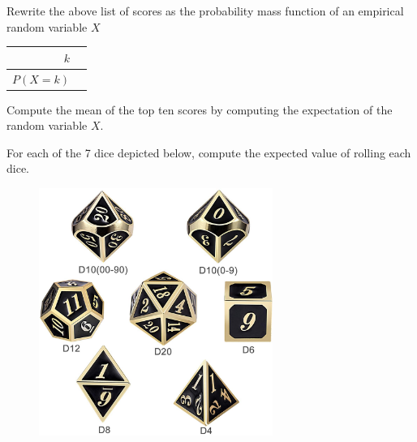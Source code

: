 \documentclass[addpoints,12pt]{exam}
\begin{document}
\begin{questions}
\addpoints

\newpage
\question[2] Rewrite the above list of scores as the probability mass function of an empirical random variable $X$

\begin{center}
\begin{tabular}{ r | l } 
$k$ & \hspace{3in} \\ 
\hline
$P(X=k)$ &  \hspace{3in} \\ 
\end{tabular}
\end{center}

\vspace{.2in}

Compute the mean of the top ten scores by computing the expectation of the random variable $X$.

\vspace{1in}

\question[7] For each of the 7 dice depicted below, compute the expected value of rolling each dice.

\begin{figure}[h]
\centering
\includegraphics[width=3in]{DnD-dice.jpg}

\end{figure}


\end{questions}
\end{document}
